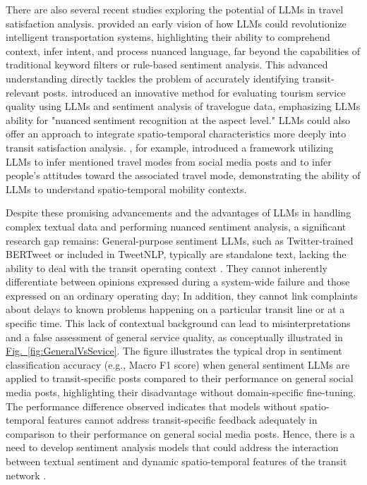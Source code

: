 \documentclass[a4paper,fleqn,12pt]{cas-sc}
\begin{document}
There are also several recent studies exploring the potential of LLMs in travel satisfaction analysis. \cite{zheng2023cha} provided an early vision of how LLMs could revolutionize intelligent transportation systems, highlighting their ability to comprehend context, infer intent, and process nuanced language, far beyond the capabilities of traditional keyword filters or rule-based sentiment analysis. This advanced understanding directly tackles the problem of accurately identifying transit-relevant posts. \cite{feng2024eva} introduced an innovative method for evaluating tourism service quality using LLMs and sentiment analysis of travelogue data, emphasizing LLMs ability for "nuanced sentiment recognition at the aspect level." LLMs could also offer an approach to integrate spatio-temporal characteristics more deeply into transit satisfaction analysis. \cite{ruan2024twi}, for example, introduced a framework utilizing LLMs to infer mentioned travel modes from social media posts and to infer people's attitudes toward the associated travel mode, demonstrating the ability of LLMs to understand spatio-temporal mobility contexts.


Despite these promising advancements and the advantages of LLMs in handling complex textual data and performing nuanced sentiment analysis, a significant research gap remains: General-purpose sentiment LLMs, such as Twitter-trained BERTweet or included in TweetNLP, typically are standalone text, lacking the ability to deal with the transit operating context \citep{camacho2022tweetnlp}. They cannot inherently differentiate between opinions expressed during a system-wide failure and those expressed on an ordinary operating day; In addition, they cannot link complaints about delays to known problems happening on a particular transit line or at a specific time. This lack of contextual background can lead to misinterpretations and a false assessment of general service quality, as conceptually illustrated in \hyperref[fig:GeneralVsSevice]{Fig.~\ref{fig:GeneralVsSevice}}. The figure illustrates the typical drop in sentiment classification accuracy (e.g., Macro F1 score) when general sentiment LLMs are applied to transit-specific posts compared to their performance on general social media posts, highlighting their disadvantage without domain-specific fine-tuning. The performance difference observed indicates that models without spatio-temporal features cannot address transit-specific feedback adequately in comparison to their performance on general social media posts. Hence, there is a need to develop sentiment analysis models that could address the interaction between textual sentiment and dynamic spatio-temporal features of the transit network \citep{lei2020inferring, cheng2025arrival}.
\end{document}
